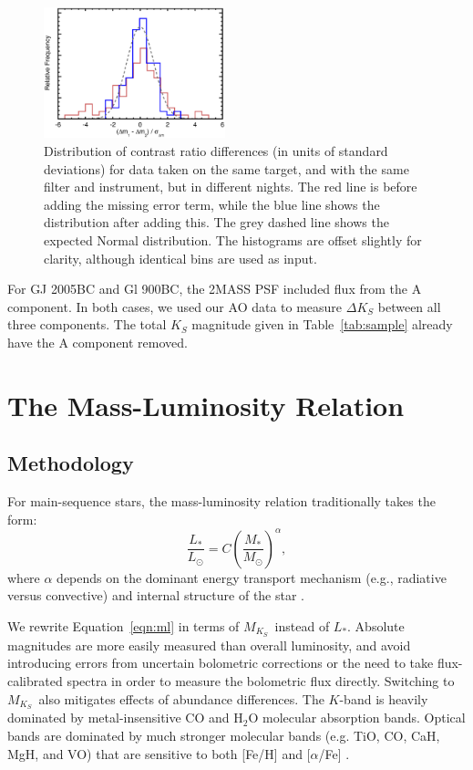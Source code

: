 \documentclass[twocolumn]{aastex62}
\newcommand{\mks}{$M_{K_S}$}
\begin{document}
\begin{figure}[t]
\begin{center}
\includegraphics[width=0.47\textwidth]{errors.eps}
\caption{Distribution of contrast ratio differences (in units of standard deviations) for data taken on the same target, and with the same filter and instrument, but in different nights. The red line is before adding the missing error term, while the blue line shows the distribution after adding this. The grey dashed line shows the expected Normal distribution. The histograms are offset slightly for clarity, although identical bins are used as input.}
\label{fig:magnitudes}
\end{center}
\end{figure}

For GJ 2005BC and Gl 900BC, the 2MASS PSF included flux from the A component. In both cases, we used our AO data to measure $\Delta K_S$ between all three components. The total $K_S$ magnitude given in Table~\ref{tab:sample} already have the A component removed. 

\section{The Mass-Luminosity Relation}\label{sec:relation}

\subsection{Methodology}\label{sec:methods}

For main-sequence stars, the mass-luminosity relation traditionally takes the form:
\begin{equation}\label{eqn:ml}
\frac{L_*}{L_\odot} = C \left(\frac{M_*}{M_\odot}\right)^\alpha,
\end{equation}
where $\alpha$ depends on the dominant energy transport mechanism (e.g., radiative versus convective) and internal structure of the star \citep{2004sipp.book.....H}.

We rewrite Equation~\ref{eqn:ml} in terms of \mks\ instead of $L_*$. Absolute magnitudes are more easily measured than overall luminosity, and avoid introducing errors from uncertain bolometric corrections or the need to take flux-calibrated spectra in order to measure the bolometric flux directly. Switching to \mks\ also mitigates effects of abundance differences. The $K$-band is heavily dominated by metal-insensitive CO and H$_2$O molecular absorption bands. Optical bands are dominated by much stronger molecular bands (e.g. TiO, CO, CaH, MgH, and VO) that are sensitive to both [Fe/H] and [$\alpha$/Fe] \citep[Figure~\ref{fig:metal}, also see][]{Woolf:2006uq,Lepine:2007fk,Mann2013a}. 
\end{document}
